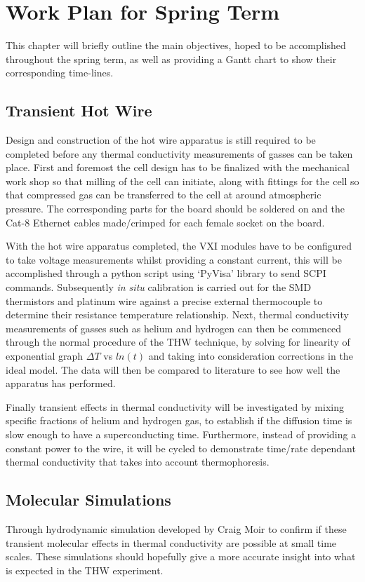 \documentclass[12pt,MEng]{UoAThesis}
\begin{document}
\chapter{Work Plan for Spring Term}

This chapter will briefly outline the main objectives, hoped to be accomplished throughout the spring term, as well as providing a Gantt chart to show their corresponding time-lines. 


\section{Transient Hot Wire}
Design and construction of the hot wire apparatus is still required to be completed before any thermal conductivity measurements of gasses can be taken place. First and foremost the cell design has to be finalized with the mechanical work shop so that milling of the cell can initiate, along with fittings for the cell so that compressed gas can be transferred to the cell at around atmospheric pressure. The corresponding parts for the board should be soldered on and the Cat-8 Ethernet cables made/crimped for each female socket on the board. 

With the hot wire apparatus completed, the VXI modules have to be configured to take voltage measurements whilst providing a constant current, this will be accomplished through a python script using `PyVisa' library to send SCPI commands. Subsequently \emph{in situ} calibration is carried out for the SMD thermistors and platinum wire against a precise external thermocouple to determine their resistance temperature relationship. Next, thermal conductivity measurements of gasses such as helium and hydrogen can then be commenced through the normal procedure of the THW technique, by solving for linearity of exponential graph $\Delta T$ vs $ln(t)$ and taking into consideration corrections in the ideal model. The data will then be compared to literature to see how well the apparatus has performed.

Finally transient effects in thermal conductivity will be investigated by mixing specific fractions of helium and hydrogen gas, to establish if the diffusion time is slow enough to have a superconducting time. Furthermore, instead of providing a constant power to the wire, it will be cycled to demonstrate time/rate dependant thermal conductivity that takes into account thermophoresis. 

\section{Molecular Simulations}
Through hydrodynamic simulation developed by Craig Moir to confirm if these transient molecular effects in thermal conductivity are possible at small time scales. These simulations should hopefully give a more accurate insight into what is expected in the THW experiment. 
\end{document}
